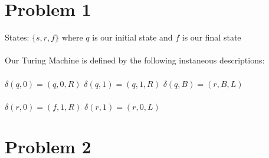 \documentclass{article}%
\begin{document}
\section*{Problem 1}

States: $\{s, r, f\}$ where $q$ is our initial state and $f$ is our final state\\
\\
Our Turing Machine is defined by the following instaneous descriptions:\\
\\
$\delta(q, 0) = (q, 0, R)$
\hfill
$\delta(q, 1) = (q, 1, R)$
\hfill
$\delta(q, B) = (r, B, L)$\\
\\
$\delta(r, 0) = (f, 1, R)$
\hfill
$\delta(r, 1) = (r, 0, L)$

\section*{Problem 2}
\end{document}
